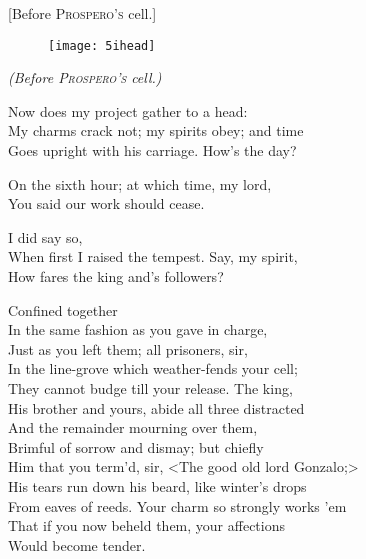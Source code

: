 
[Before \textsc{Prospero's} cell.]

\begin{figure}[t]
	\centering
	\texttt{[image: 5ihead]}
\end{figure}

\vspace{\textsink}

\textit{(Before \textsc{Prospero's} cell.)}\centering


\begin{verse_speech}[Prospero] 
Now does my project gather to a head:\\
My charms crack not; my spirits obey; and time\\
Goes upright with his carriage. How's the day?
\end{verse_speech}

\begin{verse_speech}[Ariel] 
On the sixth hour; at which time, my lord,\\
You said our work should cease.
\end{verse_speech}

\begin{verse_speech}[Prospero] 
I did say so,\\
When first I raised the tempest. Say, my spirit,\\
How fares the king and's followers?
\end{verse_speech}

\begin{verse_speech}[Ariel] 
Confined together\\
In the same fashion as you gave in charge,\\
Just as you left them; all prisoners, sir,\\
In the line-grove which weather-fends your cell;\\
They cannot budge till your release. The king,\\
His brother and yours, abide all three distracted\\
And the remainder mourning over them,\\
Brimful of sorrow and dismay; but chiefly\\
Him that you term'd, sir, <The good old lord Gonzalo;>\\
His tears run down his beard, like winter's drops\\
From eaves of reeds. Your charm so strongly works 'em\\
That if you now beheld them, your affections\\
Would become tender.
\end{verse_speech}

